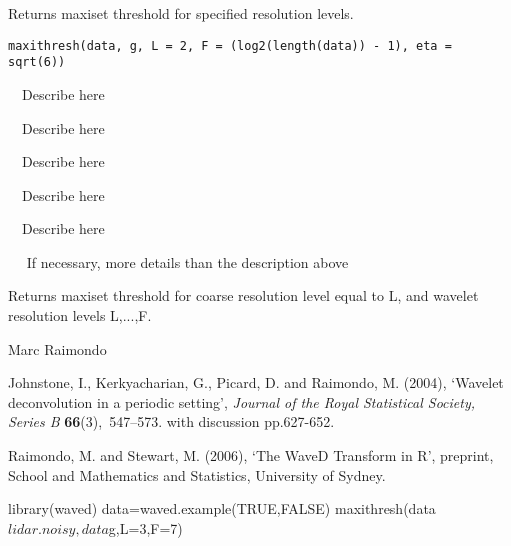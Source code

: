 \documentclass{article}
\begin{document}
\begin{Description}\relax
Returns maxiset threshold for specified resolution levels.
\end{Description}
\begin{Usage}
\begin{verbatim}
maxithresh(data, g, L = 2, F = (log2(length(data)) - 1), eta = sqrt(6))
\end{verbatim}
\end{Usage}
\begin{Arguments}
\begin{ldescription}
\item[\code{data}] ~~Describe  here~~ 
\item[\code{g}] ~~Describe  here~~ 
\item[\code{L}] ~~Describe  here~~ 
\item[\code{F}] ~~Describe  here~~ 
\item[\code{eta}] ~~Describe  here~~ 
\end{ldescription}
\end{Arguments}
\begin{Details}\relax
~~ If necessary, more details than the description above ~~
\end{Details}
\begin{Value}
Returns maxiset threshold for coarse resolution level equal to L, 
and wavelet resolution levels L,...,F.
\end{Value}
\begin{Author}\relax
Marc Raimondo
\end{Author}
\begin{References}\relax
Johnstone, I., Kerkyacharian, G., Picard, D. and Raimondo, M.  (2004), 
`Wavelet deconvolution in a periodic
setting', {\em Journal of the Royal Statistical Society, Series B} {\bf
66}(3),~547--573.  with discussion pp.627-652.

Raimondo, M. and Stewart, M. (2006),
`The WaveD Transform in R', preprint, School and Mathematics and Statistics,
University of Sydney.
\end{References}
\begin{SeeAlso}\relax
{}
\end{SeeAlso}
\begin{Examples}
\begin{ExampleCode}
library(waved)
data=waved.example(TRUE,FALSE)
maxithresh(data$lidar.noisy,data$g,L=3,F=7)
\end{ExampleCode}
\end{Examples}
\end{document}
